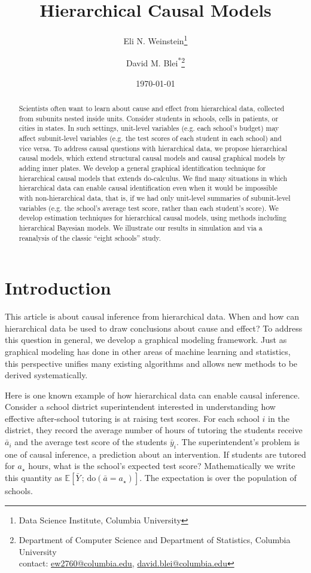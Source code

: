 \documentclass[12pt]{article}
\title{Hierarchical Causal Models}
\author{Eli N. Weinstein\thanks{Data Science Institute, Columbia University} \and  David M. Blei\textsuperscript{*}\thanks{Department of Computer Science and Department of Statistics, Columbia University\\ \indent \indent contact: \href{mailto:ew2760@columbia.edu}{ew2760@columbia.edu}, \href{mailto:david.blei@columbia.edu}{david.blei@columbia.edu}}}
\date{\today}
\newcommand{\E}[1]{\mathbb{E}\left[ #1 \right]}
\newcommand{\rmdo}{\mathrm{do}}
\newcommand{\s}{\, ; \,}
\newcommand{\cabstract}[1]{\begin{abstract} {#1} \end{abstract}}
\begin{document}
\maketitle

\cabstract{
\normalsize



  Scientists often want to learn about cause and effect from hierarchical data, collected from subunits nested inside units.  Consider students in schools, cells in patients, or cities in states.  In such settings, unit-level variables (e.g. each school's budget) may affect subunit-level variables (e.g. the test scores of each student in each school) and vice versa.  To address causal questions with hierarchical data, we propose hierarchical causal models, which extend structural causal models and causal graphical models by adding inner plates.  We develop a general graphical identification technique for hierarchical causal models that extends do-calculus.  We find many situations in which hierarchical data can enable causal identification even when it would be impossible with non-hierarchical data, that is, if we had only unit-level summaries of subunit-level variables (e.g. the school's average test score, rather than each student's score).
We develop estimation techniques for hierarchical causal models, using methods including hierarchical Bayesian models.  We illustrate our results in simulation and via a reanalysis of the classic ``eight schools'' study.
}



 \section{Introduction}
\label{sec:intro}

This article is about causal inference from hierarchical data. When
and how can hierarchical data be used to draw conclusions about cause
and effect? To address this question in general, we develop a
graphical modeling framework. Just as graphical modeling has done in
other areas of machine learning and statistics, this perspective
unifies many existing algorithms and allows new methods to be derived
systematically.

Here is one known example of how hierarchical data can enable causal inference. Consider a school district
superintendent interested in understanding how effective
after-school tutoring is at raising test scores. For each school $i$
in the district, they record the average number of hours of tutoring
the students receive $\bar{a}_i$ and the average test score of the
students $\bar{y}_i$. The superintendent's problem is one of causal
inference, a prediction about an intervention. If students are tutored for $a_\star$ hours, what is the school's expected test score? Mathematically
we write this quantity as $\E{\bar{Y} \s \rmdo(\bar{a}=a_\star)}$.
The
expectation is over the population of schools.
\end{document}
